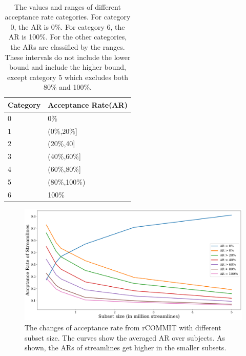 \begin{table}[!ht]
    \centering
    \caption{The values and ranges of different acceptance rate categories. For category 0, the AR is 0\%.
         For category 6, the AR is 100\%. For the other categories, the ARs are classified by the ranges. These intervals 
         do not include the lower bound and include the higher bound, except category 5 which excludes both 80\% and 100\%.}
    ~\\
    \label{table:cate}
    \begin{tabular}{p{5cm} p{5cm}}
    \toprule
    \textbf{Category}		  & \textbf{Acceptance Rate(AR)}\\
    \hline
    0                   & 0\% \\
    \hline
    1                   & (0\%,20\%{]} \\
    \hline
    2                 & (20\%,40{]} \\
    \hline
    3                 & (40\%,60\%{]} \\
    \hline
    4                 & (60\%,80\%{]} \\
    \hline 
    5                 & (80\%,100\%) \\
    \hline
    6                 & 100\% \\
    \bottomrule
    \end{tabular}
\end{table}

\begin{figure}[ht]
    \centering
    \includegraphics[width= 12cm]{figures/ARplot.png}
        \caption{The changes of acceptance rate from rCOMMIT with different subset size.
        The curves show the averaged AR over subjects. As shown, the ARs of streamlines get higher in the smaller
        subsets.}
    \label{fig:ARplot}
\end{figure}

